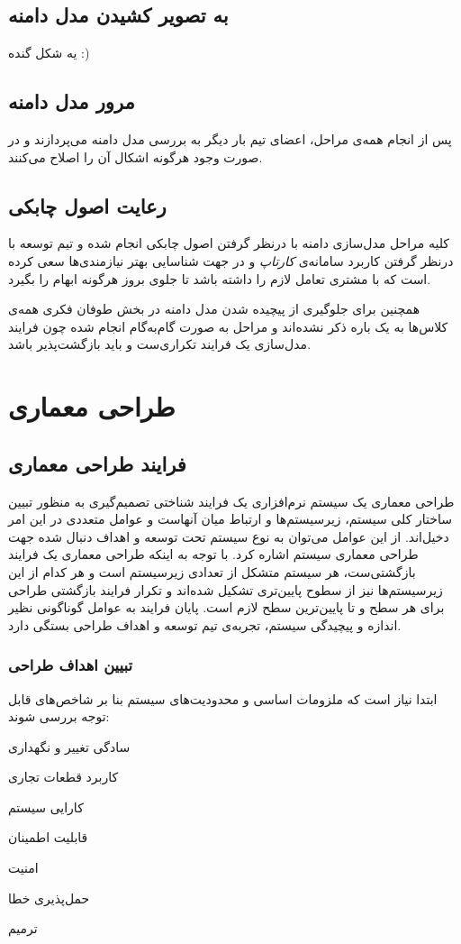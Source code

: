 \documentclass[12pt,svgnames,oneside]{book}
\newcounter{itemadded}
\let\LaTeXStandardEnumerateBegin\enumerate
\let\LaTeXStandardEnumerateEnd\endenumerate
\renewenvironment{enumerate}{%
\LaTeXStandardEnumerateBegin%
\setcounter{itemadded}{0}
}{%
\LaTeXStandardEnumerateEnd%
}%
\begin{document}
\section{به تصویر کشیدن مدل دامنه}
یه شکل گنده :)
\section{مرور مدل دامنه}
پس از انجام همه‌ی مراحل، اعضای تیم بار دیگر به بررسی مدل دامنه می‌پردازند و در صورت وجود هرگونه اشکال آن را اصلاح می‌کنند.

\section{رعایت اصول چابکی}
کلیه مراحل مدل‌سازی دامنه با درنظر گرفتن اصول چابکی انجام شده و تیم توسعه با درنظر گرفتن کاربرد سامانه‌ی \textit{کارتاپ} و در جهت شناسایی بهتر نیازمندی‌ها سعی کرده است که با مشتری تعامل لازم را داشته باشد تا جلوی بروز هرگونه ابهام را بگیرد.

همچنین برای جلوگیری از پیچیده‌ شدن مدل دامنه در بخش طوفان فکری همه‌ی کلاس‌ها به یک باره ذکر نشده‌اند و مراحل به صورت گام‌به‌گام انجام شده چون فرایند مدل‌سازی یک فرایند تکراری‌ست و باید بازگشت‌پذیر باشد.

\chapter{طراحی معماری}

\section{فرایند طراحی معماری}	
طراحی معماری یک سیستم نرم‌افزاری یک فرایند شناختی تصمیم‌گیری به منظور تبیین ساختار کلی سیستم، زیرسیستم‌ها و ارتباط میان آنهاست و عوامل متعددی در این امر دخیل‌اند. از این عوامل می‌توان به نوع سیستم تحت توسعه و اهداف دنبال شده جهت طراحی معماری سیستم اشاره کرد. با توجه به اینکه طراحی معماری یک فرایند بازگشتی‌ست، هر سیستم متشکل از تعدادی زیرسیستم است و هر کدام از این زیرسیستم‌ها نیز از سطوح پایین‌تری تشکیل شده‌اند و تکرار فرایند بازگشتی طراحی برای هر سطح و تا پایین‌ترین سطح لازم است. پایان فرایند به عوامل گوناگونی نظیر اندازه و پیچیدگی سیستم، تجربه‌ی تیم توسعه و اهداف طراحی بستگی دارد.

\subsection{تبیین اهداف طراحی}			
ابتدا نیاز است که ملزومات اساسی و محدودیت‌های سیستم بنا بر شاخص‌های قابل توجه بررسی شوند:
\begin{enumerate}
\item
سادگی تغییر و نگهداری
\item
کاربرد قطعات تجاری
\item
کارایی سیستم
\item
قابلیت اطمینان
\item
امنیت
\item
حمل‌پذیری خطا
\item
ترمیم
\end{enumerate}
\end{document}
